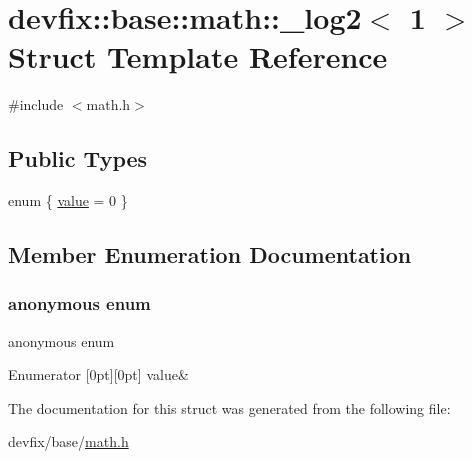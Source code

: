 \hypertarget{structdevfix_1_1base_1_1math_1_1__log2_3_011_01_4}{}\section{devfix\+:\+:base\+:\+:math\+:\+:\+\_\+log2$<$ 1 $>$ Struct Template Reference}
\label{structdevfix_1_1base_1_1math_1_1__log2_3_011_01_4}


{\ttfamily \#include $<$math.\+h$>$}

\subsection*{Public Types}
\begin{DoxyCompactItemize}
\item 
enum \{ \hyperlink{structdevfix_1_1base_1_1math_1_1__log2_3_011_01_4_ae77c39556ff5e646dc219024b8147b3da0278c02162e20feef20ce19664bb2109}{value} = 0
 \}
\end{DoxyCompactItemize}


\subsection{Member Enumeration Documentation}
\mbox{\label{structdevfix_1_1base_1_1math_1_1__log2_3_011_01_4_ae77c39556ff5e646dc219024b8147b3d}} 
\subsubsection{\texorpdfstring{anonymous enum}{anonymous enum}}
{\footnotesize\ttfamily anonymous enum}

\begin{DoxyEnumFields}{Enumerator}
[0pt][0pt]{}\mbox{\label{structdevfix_1_1base_1_1math_1_1__log2_3_011_01_4_ae77c39556ff5e646dc219024b8147b3da0278c02162e20feef20ce19664bb2109}} 
value&\\
\hline

\end{DoxyEnumFields}


The documentation for this struct was generated from the following file\+:\begin{DoxyCompactItemize}
\item 
devfix/base/\hyperlink{math_8h}{math.\+h}\end{DoxyCompactItemize}
